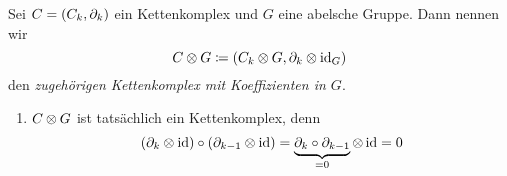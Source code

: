 \begin{defn}
  Sei $C = (C_k, \partial_k)$ ein Kettenkomplex und $G$ eine abelsche Gruppe.
  Dann nennen wir
  \begin{equation*}
    C \otimes G \coloneqq (C_k \otimes G, \partial_k \otimes \operatorname{id}_G)
  \end{equation*}
  den \emph{zugehörigen Kettenkomplex mit Koeffizienten in $G$}.
\end{defn}

\begin{kommentar}
  \begin{enumerate}
    \item
      $C \otimes G$ ist tatsächlich ein Kettenkomplex, denn
      \begin{equation*}
        (\partial_k \otimes \operatorname{id}) \circ (\partial_{k-1} \otimes \operatorname{id}) = \underbrace{\partial_k \circ \partial_{k-1}}_{= 0} \otimes \operatorname{id} = 0
      \end{equation*}
  \end{enumerate}
\end{kommentar}
